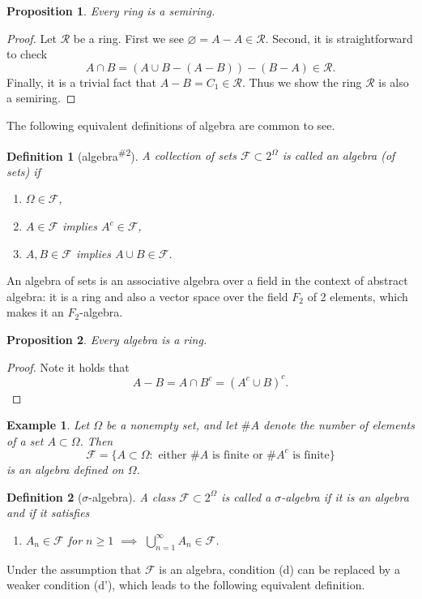 \documentclass{report}
\newtheorem{definition}{Definition}[section]
\newtheorem{example}{Example}[section]
\newtheorem{proposition}{Proposition}[section]
\theoremstyle{nonumberplain}
\newtheorem{proof}{Proof.}
\begin{document}
\begin{proposition}
	Every ring is a semiring.
\end{proposition}
\begin{proof}
	Let $\mathcal{R}$ be a ring. First we see $\varnothing=A-A\in \mathcal{R}$. Second, it is straightforward to check
	$$A\cap B=(A\cup B-(A-B))-(B-A)\in\mathcal{R}.$$
	Finally, it is a trivial fact that $A-B=C_1\in\mathcal{R}$. Thus we show the ring $\mathcal{R}$ is also a semiring.
\end{proof}
The following equivalent definitions of algebra are common to see.
\begin{definition}[algebra\textsuperscript{\#2}]
	A collection of sets $\mathcal{F}\subset 2^{\Omega}$ is called an  \emph{algebra (of sets)} if
	\begin{enumerate}
		\item [(a)] $\Omega\in\mathcal{F}$, 
		\item [(b)] $A \in\mathcal{F}$ implies $A^c\in\mathcal{F}$, 
		\item [(c)] $A,B\in\mathcal{F}$ implies $A\cup B\in\mathcal{F}$.
	\end{enumerate}
\end{definition}
An algebra of sets is an associative algebra over a field in the context of abstract algebra: it is a ring and also a vector space over the field $F_2$ of 2 elements, which makes it an $F_2$-algebra. 

\begin{proposition}
	Every algebra is a ring.
\end{proposition}
\begin{proof}
	Note it holds that 
	\[
	A-B=A\cap B^c=(A^c\cup B)^c.
	\]
\end{proof}

\begin{example}
	Let $\Omega$ be a nonempty set, and let $\#A$ denote the number of elements of a set $A\subset\Omega$. Then
	\[
	\mathcal{F} = \{A\subset \Omega : \text{ either }\#A\text{ is finite or }\#A^c\text{ is finite}\}
	\]
	is an algebra defined on $\Omega$.
\end{example}

\begin{definition}[$\sigma$-algebra]
A class $\mathcal{F}\subset 2^{\Omega}$ is called a \emph{$\sigma$-algebra} if it is an algebra and if it satisfies
\begin{enumerate}
	\item [(d)] $A_n\in\mathcal{F}$ for $n\ge 1$ $\implies$ $\bigcup\limits_{n=1}^\infty A_n\in\mathcal{F}$.
\end{enumerate}
\end{definition}
Under the assumption that $\mathcal{F}$ is an algebra, condition (d) can be replaced by a weaker condition (d'), which leads to the following equivalent definition.
\end{document}
